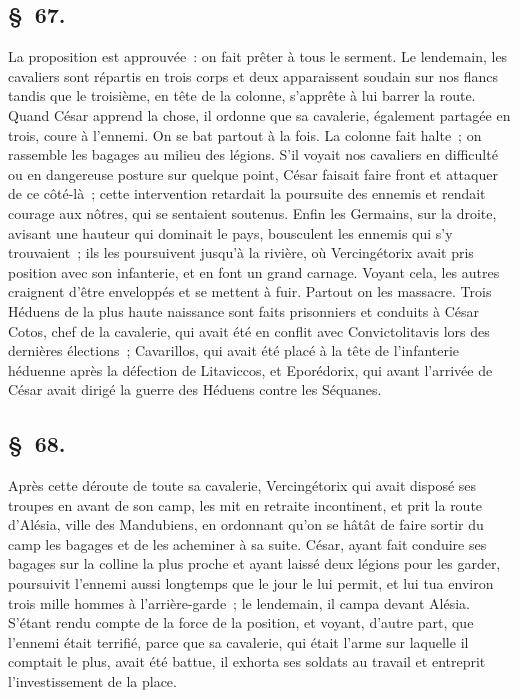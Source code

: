 \documentclass[french,twoside]{book} %
\begin{document}
\subsection[{§ 67.}]{ \textsc{§ 67.} }
\noindent La proposition est approuvée : on fait prêter à tous le serment. Le lendemain, les cavaliers sont répartis en trois corps et deux apparaissent soudain sur nos flancs tandis que le troisième, en tête de la colonne, s’apprête à lui barrer la route. Quand César apprend la chose, il ordonne que sa cavalerie, également partagée en trois, coure à l’ennemi. On se bat partout à la fois. La colonne fait halte ; on rassemble les bagages au milieu des légions. S'il voyait nos cavaliers en difficulté ou en dangereuse posture sur quelque point, César faisait faire front et attaquer de ce côté-là ; cette intervention retardait la poursuite des ennemis et rendait courage aux nôtres, qui se sentaient soutenus. Enfin les Germains, sur la droite, avisant une hauteur qui dominait le pays, bousculent les ennemis qui s’y trouvaient ; ils les poursuivent jusqu’à la rivière, où Vercingétorix avait pris position avec son infanterie, et en font un grand carnage. Voyant cela, les autres craignent d’être enveloppés et se mettent à fuir. Partout on les massacre. Trois Héduens de la plus haute naissance sont faits prisonniers et conduits à César Cotos, chef de la cavalerie, qui avait été en conflit avec Convictolitavis lors des dernières élections ; Cavarillos, qui avait été placé à la tête de l’infanterie héduenne après la défection de Litaviccos, et Eporédorix, qui avant l’arrivée de César avait dirigé la guerre des Héduens contre les Séquanes.
\subsection[{§ 68.}]{ \textsc{§ 68.} }
\noindent Après cette déroute de toute sa cavalerie, Vercingétorix qui avait disposé ses troupes en avant de son camp, les mit en retraite incontinent, et prit la route d’Alésia, ville des Mandubiens, en ordonnant qu’on se hâtât de faire sortir du camp les bagages et de les acheminer à sa suite. César, ayant fait conduire ses bagages sur la colline la plus proche et ayant laissé deux légions pour les garder, poursuivit l’ennemi aussi longtemps que le jour le lui permit, et lui tua environ trois mille hommes à l’arrière-garde ; le lendemain, il campa devant Alésia. S'étant rendu compte de la force de la position, et voyant, d’autre part, que l’ennemi était terrifié, parce que sa cavalerie, qui était l’arme sur laquelle il comptait le plus, avait été battue, il exhorta ses soldats au travail et entreprit l’investissement de la place.
\end{document}
